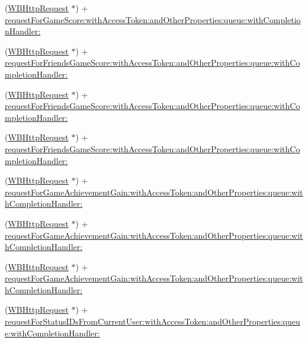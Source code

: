 \begin{DoxyCompactItemize}
\item 
(\mbox{\hyperlink{interface_w_b_http_request}{W\+B\+Http\+Request}} $\ast$) + \mbox{\hyperlink{interface_w_b_http_request_aebf781874099f199819a90a1f83f06d5}{request\+For\+Game\+Score\+:with\+Access\+Token\+:and\+Other\+Properties\+:queue\+:with\+Completion\+Handler\+:}}
\item 
(\mbox{\hyperlink{interface_w_b_http_request}{W\+B\+Http\+Request}} $\ast$) + \mbox{\hyperlink{interface_w_b_http_request_a07bfa63c702e8a920513d8b0accaf693}{request\+For\+Friends\+Game\+Score\+:with\+Access\+Token\+:and\+Other\+Properties\+:queue\+:with\+Completion\+Handler\+:}}
\item 
(\mbox{\hyperlink{interface_w_b_http_request}{W\+B\+Http\+Request}} $\ast$) + \mbox{\hyperlink{interface_w_b_http_request_a07bfa63c702e8a920513d8b0accaf693}{request\+For\+Friends\+Game\+Score\+:with\+Access\+Token\+:and\+Other\+Properties\+:queue\+:with\+Completion\+Handler\+:}}
\item 
(\mbox{\hyperlink{interface_w_b_http_request}{W\+B\+Http\+Request}} $\ast$) + \mbox{\hyperlink{interface_w_b_http_request_a07bfa63c702e8a920513d8b0accaf693}{request\+For\+Friends\+Game\+Score\+:with\+Access\+Token\+:and\+Other\+Properties\+:queue\+:with\+Completion\+Handler\+:}}
\item 
(\mbox{\hyperlink{interface_w_b_http_request}{W\+B\+Http\+Request}} $\ast$) + \mbox{\hyperlink{interface_w_b_http_request_aa17d2d459bebe0e5544e64eb307d2098}{request\+For\+Game\+Achievement\+Gain\+:with\+Access\+Token\+:and\+Other\+Properties\+:queue\+:with\+Completion\+Handler\+:}}
\item 
(\mbox{\hyperlink{interface_w_b_http_request}{W\+B\+Http\+Request}} $\ast$) + \mbox{\hyperlink{interface_w_b_http_request_aa17d2d459bebe0e5544e64eb307d2098}{request\+For\+Game\+Achievement\+Gain\+:with\+Access\+Token\+:and\+Other\+Properties\+:queue\+:with\+Completion\+Handler\+:}}
\item 
(\mbox{\hyperlink{interface_w_b_http_request}{W\+B\+Http\+Request}} $\ast$) + \mbox{\hyperlink{interface_w_b_http_request_aa17d2d459bebe0e5544e64eb307d2098}{request\+For\+Game\+Achievement\+Gain\+:with\+Access\+Token\+:and\+Other\+Properties\+:queue\+:with\+Completion\+Handler\+:}}
\item 
(\mbox{\hyperlink{interface_w_b_http_request}{W\+B\+Http\+Request}} $\ast$) + \mbox{\hyperlink{interface_w_b_http_request_ac75a0b99ef6dba004af29cd7c2498149}{request\+For\+Status\+I\+Ds\+From\+Current\+User\+:with\+Access\+Token\+:and\+Other\+Properties\+:queue\+:with\+Completion\+Handler\+:}}

\end{DoxyCompactItemize}
